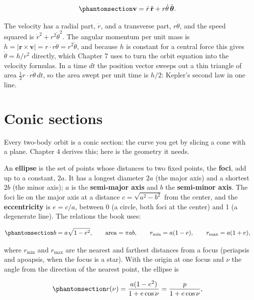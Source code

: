 \documentclass[
  10.5pt,
  letterpaper,
]{scrbook}
\theoremstyle{plain}
\theoremstyle{remark}
\begin{document}
\begin{equation}\protect\phantomsection\label{eq-polar-velocity}{
\mathbf{v} = \dot r\,\hat{\mathbf{r}} + r\dot\theta\,\hat{\boldsymbol{\theta}}.
}\end{equation}

The velocity has a radial part, \(\dot r\), and a transverse part,
\(r\dot\theta\), and the speed squared is
\(\dot r^2 + r^2\dot\theta^2\). The angular momentum per unit mass is
\(h = |\mathbf{r}\times\mathbf{v}| = r\cdot r\dot\theta = r^2\dot\theta\),
and because \(h\) is constant for a central force this gives
\(\dot\theta = h/r^2\) directly, which Chapter 7 uses to turn the orbit
equation into the velocity formulas. In a time \(dt\) the position
vector sweeps out a thin triangle of area
\(\tfrac12 r\cdot r\dot\theta\,dt\), so the area swept per unit time is
\(h/2\): Kepler's second law in one line.

\section{Conic sections}\label{conic-sections}

Every two-body orbit is a conic section: the curve you get by slicing a
cone with a plane. Chapter 4 derives this; here is the geometry it
needs.

An \textbf{ellipse} is the set of points whose distances to two fixed
points, the \textbf{foci}, add up to a constant, \(2a\). It has a
longest diameter \(2a\) (the major axis) and a shortest \(2b\) (the
minor axis); \(a\) is the \textbf{semi-major axis} and \(b\) the
\textbf{semi-minor axis}. The foci lie on the major axis at a distance
\(c = \sqrt{a^2 - b^2}\) from the center, and the \textbf{eccentricity}
is \(e = c/a\), between 0 (a circle, both foci at the center) and 1 (a
degenerate line). The relations the book uses:

\begin{equation}\protect\phantomsection\label{eq-ellipse-facts}{
b = a\sqrt{1-e^2}, \qquad \text{area} = \pi a b, \qquad r_{\min} = a(1-e), \qquad r_{\max} = a(1+e),
}\end{equation}

where \(r_{\min}\) and \(r_{\max}\) are the nearest and farthest
distances from a focus (periapsis and apoapsis, when the focus is a
star). With the origin at one focus and \(\nu\) the angle from the
direction of the nearest point, the ellipse is

\begin{equation}\protect\phantomsection\label{eq-conic-polar}{
r(\nu) = \frac{a(1-e^2)}{1 + e\cos\nu} = \frac{p}{1 + e\cos\nu},
}\end{equation}
\end{document}
